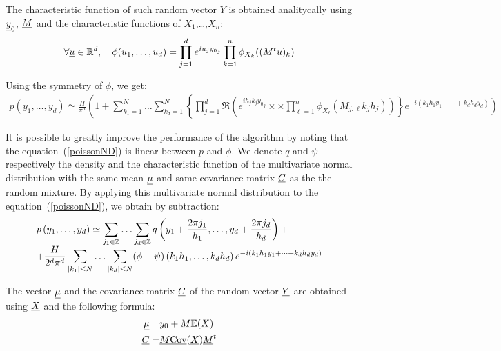 The characteristic function of such random vector $Y$ is obtained analitycally using ${\underline{y}}_0$, ${\underline{M}}$ and the characteristic functions of $X_1$,\dots,$X_n$:
\begin{align}
  \forall {\underline{u}}\in\mathbb{R}^d,\quad\phi(u_1,\hdots,u_d)=\prod_{j=1}^de^{iu_j{y_0}_j}\prod_{k=1}^n\phi_{X_k}((M^tu)_k)
\end{align}

Using the symmetry of $\phi$, we get:
\begin{align}
  p\left(y_1,\hdots,y_d\right)\simeq\frac{H}{\pi^d} \left(1+\sum_{k_1=1}^N\hdots\sum_{k_d=1}^N\left\{\prod_{j=1}^d\mathfrak{R}\left(e^{ih_jk_j{y_0}_j}
  \times\right.\right.\right.\left.\left.\times\prod_{\ell=1}^n\phi_{X_\ell}(M_{j,\ell}k_jh_j)\right)\right\}\left.e^{-i(k_1h_1y_1+\cdots+k_dh_dy_d)} \right)
\end{align}

It is possible to greatly improve the performance of the algorithm by noting that the equation~(\ref{poissonND}) is linear between $p$
and $\phi $. We denote $q$ and $\psi$ respectively the density and the characteristic function of the multivariate normal distribution with the
same mean ${\underline{\mu}}$ and same covariance matrix ${\underline{C}}$ as the the random mixture. By applying this multivariate normal distribution to the equation~(\ref{poissonND}), we obtain by subtraction:
\begin{align}\label{algoPoisson}
  \begin{array}{p{\textwidth}}
    \multicolumn{1}{l}{\displaystyle p\left(y_1,\hdots,y_d\right)\simeq \sum_{j_1\in\mathbb{Z}}\hdots\sum_{j_d\in\mathbb{Z}}q\left(y_1+\frac{2\pi j_1}{h_1},\hdots,y_d+\frac{2\pi j_d}{h_d}\right)+}\\
    \multicolumn{1}{r}{+\displaystyle \frac{H}{2^d\pi^d}\sum_{|k_1|\leq N}\hdots\sum_{|k_d|\leq N}(\phi-\psi)\left(k_1h_1,\hdots,k_dh_d\right)e^{-i(k_1h_1y_1+\cdots+k_dh_dy_d)}}
  \end{array}
\end{align}

The vector ${\underline{\mu}}$ and the covariance matrix ${\underline{C}}$ of the random vector ${\underline{Y}}$ are obtained using ${\underline{X}}$ and the following formula:
\begin{align}
  {\underline{\mu}}=& y_0 + {\underline{M}}\mathbb{E}({\underline{X}})\\
  {\underline{C}}=&{\underline{M}}{\underline{\mathrm{Cov}}}({\underline{X}}){\underline{M}}^t\\
\end{align}

